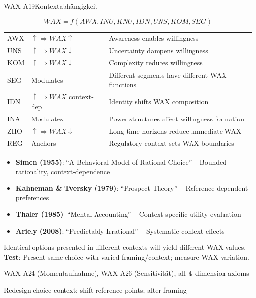 
\begin{axiomspec}{WAX-A19}{Kontextabhängigkeit}

\begin{equation}
WAX = f(AWX, INU, KNU, IDN, UNS, KOM, SEG)
\end{equation}

\begin{tabular}{lll}
AWX & $\uparrow \Rightarrow WAX \uparrow$ & Awareness enables willingness \\
UNS & $\uparrow \Rightarrow WAX \downarrow$ & Uncertainty dampens willingness \\
KOM & $\uparrow \Rightarrow WAX \downarrow$ & Complexity reduces willingness \\
SEG & Modulates & Different segments have different WAX functions \\
IDN & $\uparrow \Rightarrow WAX$ context-dep & Identity shifts WAX composition \\
INA & Modulates & Power structures affect willingness formation \\
ZHO & $\uparrow \Rightarrow WAX \downarrow$ & Long time horizons reduce immediate WAX \\
REG & Anchors & Regulatory context sets WAX boundaries \\
\end{tabular}

\begin{itemize}
\item \textbf{Simon (1955)}: ``A Behavioral Model of Rational Choice'' -- Bounded rationality, context-dependence
\item \textbf{Kahneman \& Tversky (1979)}: ``Prospect Theory'' -- Reference-dependent preferences
\item \textbf{Thaler (1985)}: ``Mental Accounting'' -- Context-specific utility evaluation
\item \textbf{Ariely (2008)}: ``Predictably Irrational'' -- Systematic context effects
\end{itemize}

Identical options presented in different contexts will yield different WAX values.
\textbf{Test}: Present same choice with varied framing/context; measure WAX variation.

WAX-A24 (Momentaufnahme), WAX-A26 (Sensitivität), all Ψ-dimension axioms

Redesign choice context; shift reference points; alter framing

\end{axiomspec}


